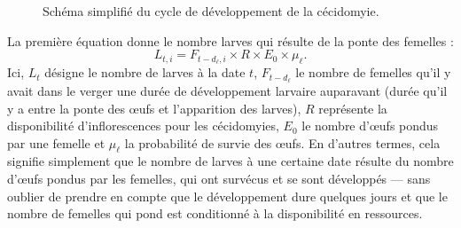 \begin{figure}[ht]
 \centering
 \caption{Schéma simplifié du cycle de développement de la cécidomyie.}
 \label{fig:schema_simple}
\end{figure}


La première équation donne le nombre larves qui résulte de la ponte des femelles :
\begin{equation}
 L_{t, i} = F_{t - d_{\ell}, i} \times R \times E_0 \times \mu_{\ell}.
 \label{eq:larves}
\end{equation}
Ici, $L_t$ désigne le nombre de larves à la date $t$, $F_{t - d_{\ell}}$ le nombre de femelles qu'il y avait dans le verger une durée de développement larvaire auparavant (durée qu'il y a entre la ponte des œufs et l'apparition des larves), $R$ représente la disponibilité d'inflorescences pour les cécidomyies, $E_0$ le nombre d'œufs pondus par une femelle et $\mu_{\ell}$ la probabilité de survie des œufs.
En d'autres termes, cela signifie simplement que le nombre de larves à une certaine date résulte du nombre d'œufs pondus par les femelles, qui ont survécus et se sont développés --- sans oublier de prendre en compte que le développement dure quelques jours et que le nombre de femelles qui pond est conditionné à la disponibilité en ressources.

